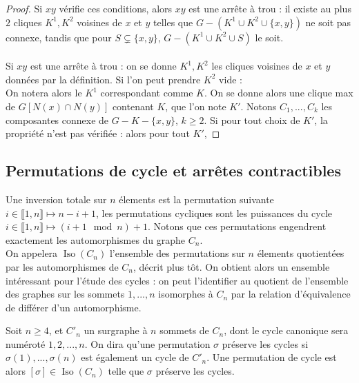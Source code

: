 \documentclass{scrartcl}
\begin{document}
\begin{flushleft}
\begin{prop}
\end{prop}

\begin{proof}
    Si $xy$ vérifie ces conditions, alors $xy$ est une arrête à trou : il existe au plus $2$ cliques $K^1, K^2$ voisines de $x$ et $y$
    telles que $G - (K^1 \cup K^2 \cup \{x,y\})$ ne soit pas connexe, tandis que pour $S \subsetneq \{x,y\}$, $G - (K^1 \cup K^2 \cup S)$
    le soit.
    \\~\\
    Si $xy$ est une arrête à trou : on se donne $K^1, K^2$ les cliques voisines de $x$ et $y$ données par la définition.
    Si l'on peut prendre $K^2$ vide :\\
    On notera alors le $K^1$ correspondant comme $K$. On se donne alors une clique max de $G[N(x) \cap N(y)]$ contenant $K$, que l'on note $K'$.
    Notons $C_1, ..., C_k$ les composantes connexe de $G - K - \{x,y\}$, $k \geq 2$. Si pour tout choix de $K'$, la propriété n'est pas
    vérifiée : alors pour tout $K'$, 
\end{proof}

\subsection{Permutations de cycle et arrêtes contractibles}

Une inversion totale sur $n$ élements est la permutation suivante $ i \in \llbracket 1, n \rrbracket \longmapsto n - i + 1$,
les permutations cycliques sont les puissances du cycle $ i \in \llbracket 1, n \rrbracket \longmapsto (i+1 \mod n) + 1$.
Notons que ces permutations engendrent exactement les automorphismes du graphe $C_n$.\\
On appelera $\operatorname*{Iso}(C_n)$ l'ensemble des permutations sur $n$ élements quotientées par les automorphismes de
$C_n$, décrit plus tôt. On obtient alors un ensemble intéressant pour l'étude des cycles : on peut l'identifier
au quotient de l'ensemble des graphes sur les sommets $1, ..., n$ isomorphes à $C_n$ par la relation d'équivalence de différer
d'un automorphisme.

\begin{def*}
    Soit $n \geq 4$, et $C'_n$ un surgraphe à $n$ sommets de $C_n$, dont le cycle canonique sera numéroté $1, 2, ..., n$.
    On dira qu'une permutation $\sigma$ préserve les cycles si $\sigma(1), ..., \sigma(n)$ est également un cycle de $C'_n$.
    Une permutation de cycle est alors $[\sigma] \in \operatorname*{Iso}(C_n)$ telle que $\sigma$ préserve les cycles.
\end{def*}


\end{flushleft}
\end{document}
